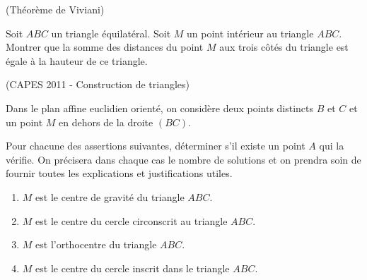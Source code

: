 \documentclass[a4paper,12pt,reqno]{amsart}
\begin{document}
\begin{exo} (Théorème de Viviani)

  Soit $ABC$ un triangle équilatéral. Soit $M$ un point intérieur au triangle $ABC$. Montrer que la somme des distances du point $M$ aux trois côtés du triangle est égale à la hauteur de ce triangle.
\end{exo}

\begin{solution}
\end{solution}

\begin{exo} (CAPES 2011 - Construction de triangles)

 Dans le plan affine euclidien orienté, on considère deux points distincts $B$ et $C$ et un point $M$ en dehors de la droite $(BC)$.

 Pour chacune des assertions suivantes, déterminer s'il existe un point $A$ qui la vérifie. On précisera dans chaque cas le nombre de solutions et on prendra soin de fournir toutes les explications et justifications utiles.
   \begin{enumerate}
    \item $M$ est le centre de gravité du triangle $ABC$.
    \item $M$ est le centre du cercle circonscrit au triangle $ABC$.
    \item $M$ est l'orthocentre du triangle $ABC$.
    \item $M$ est le centre du cercle inscrit dans le triangle $ABC$.
   \end{enumerate}
\end{exo}
\end{document}
